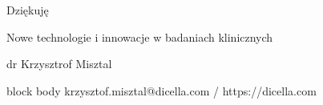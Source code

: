 \begin{frame}{Dziękuję}
  \begin{center}
    {\Large Nowe technologie i innowacje w badaniach klinicznych}\par
    \vspace{1em}
    {\large dr Krzysztrof Misztal}\par
    \vspace{1.5em}
    \begin{beamercolorbox}[wd=0.72\linewidth,sep=1em,rounded=true]{block body}
      \centering
      \vspace{0.5em}
      krzysztof.misztal@dicella.com / https://dicella.com
    \end{beamercolorbox}
  \end{center}
\end{frame}
